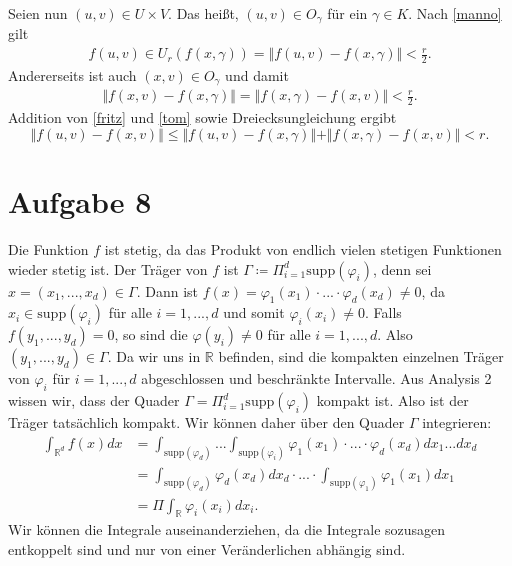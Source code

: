 \documentclass[a4paper,fontsize=8pt,DIV=1]{article}
\theoremstyle{plain}
\begin{document}
\begin{enumerate}[label=(\roman*)]
	Seien nun $(u,v) \in U \times V$. Das heißt, $(u,v) \in O_\gamma$ für ein $\gamma \in K$. Nach \eqref{manno} gilt
	\begin{align} \label{fritz}
		f(u,v) \in U_r(f(x,\gamma)) = \Vert f(u,v) - f(x,\gamma) \Vert < \frac{r}{2}.
	\end{align}
	Andererseits ist auch $(x,v) \in O_{\gamma}$ und damit
	\begin{align} \label{tom}
		\Vert f(x,v) - f(x, \gamma) \Vert = \Vert f(x, \gamma) - f(x,v) \Vert < \frac{r}{2}.
	\end{align}
	Addition von \eqref{fritz} und \eqref{tom} sowie Dreiecksungleichung ergibt 
	\[
		 \Vert f(u,v) - f(x,v) \Vert \leq \Vert f(u,v) - f(x,\gamma) \Vert + \Vert f(x, \gamma) - f(x,v) \Vert < r.
	\]

\end{enumerate}
	
\section*{Aufgabe 8}
Die Funktion $f$ ist stetig, da das Produkt von endlich vielen stetigen Funktionen wieder stetig ist. Der Träger von $f$ ist $\Gamma \coloneqq \Pi_{i=1}^d \mathrm{supp}(\varphi_i)$, denn sei $x=(x_1,...,x_d) \in \Gamma$. Dann ist $f(x) = \varphi_1(x_1) \cdot ... \cdot \varphi_d(x_d) \neq 0$, da $x_i \in \mathrm{supp}(\varphi_i)$ für alle $i=1,...,d$ und somit $\varphi_i(x_i) \neq 0$. Falls $f(y_1,...,y_d) = 0$, so sind die $\varphi(y_i) \neq 0$ für alle $i = 1,...,d$. Also $(y_1,...,y_d) \in \Gamma$. Da wir uns in $\mathbb R$ befinden, sind die kompakten einzelnen Träger von $\varphi_{i}$ für $i=1,...,d$ abgeschlossen und beschränkte Intervalle. Aus Analysis 2 wissen wir, dass der Quader $\Gamma = \Pi_{i=1}^d \mathrm{supp}(\varphi_i)$ kompakt ist. Also ist der Träger tatsächlich kompakt. Wir können daher über den Quader $\Gamma$ integrieren:
\begin{align*}
	\int_{\mathbb R^d}f(x)dx  &= \int_{\mathrm{supp}(\varphi_d)}...\int_{\mathrm{supp}(\varphi_i)} \varphi_1(x_1) \cdot ... \cdot \varphi_d(x_d) dx_1 ... dx_d \\
	&=  \int_{\mathrm{supp}(\varphi_d)}\varphi_d(x_d)dx_d \cdot ... \cdot \int_{\mathrm{supp}(\varphi_1)}\varphi_1(x_1)dx_1 \\
	&= \Pi \int_{\mathbb R}\varphi_i(x_i)dx_i.
\end{align*}
Wir können die Integrale auseinanderziehen, da die Integrale sozusagen entkoppelt sind und nur von einer Veränderlichen abhängig sind.
\end{document}
